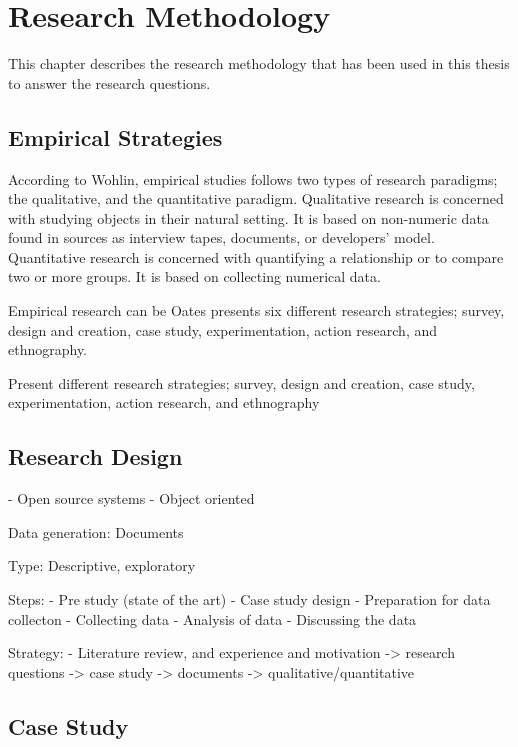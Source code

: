
\chapter{Research Methodology}

This chapter describes the research methodology that has been used in this thesis to answer the research questions. 

\section{Empirical Strategies}
According to Wohlin\cite{Wohlin:2000:ESE:330775}, empirical studies follows two types of research paradigms; the qualitative, and the quantitative paradigm. Qualitative research is concerned with studying objects in their natural setting\cite{Wohlin:2000:ESE:330775}. It is based on non-numeric data found in sources as interview tapes, documents, or developers' model. Quantitative research is concerned with quantifying a relationship or to compare two or more groups\cite{Wohlin:2000:ESE:330775}. It is based on collecting numerical data. 

Empirical research can be Oates\cite{Oates:2006:RIS:1202299} presents six different research strategies; survey, design and creation, case study, experimentation, action research, and ethnography. 



Present different research strategies; survey, design and creation, case study, experimentation, action research, and ethnography




\section{Research Design}

- Open source systems
- Object oriented

Data generation: Documents

Type: Descriptive, exploratory

Steps:
- Pre study (state of the art)
- Case study design
- Preparation for data collecton
- Collecting data
- Analysis of data
- Discussing the data            


Strategy:
- Literature review, and experience and motivation -> research questions -> case study -> documents -> qualitative/quantitative



\section{Case Study}


